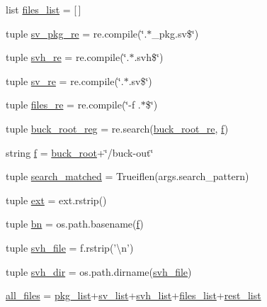\begin{DoxyCompactItemize}
\item 
list \hyperlink{namespacesrc_1_1fb__utils_a09317442a563dfcfc733583405a3b8c9}{files\-\_\-list} = \mbox{[}$\,$\mbox{]}
\item 
tuple \hyperlink{namespacesrc_1_1fb__utils_a266877c1370ada613f730519fd34b9d7}{sv\-\_\-pkg\-\_\-re} = re.\-compile(\char`\"{}.$\ast$\-\_\-pkg.\-sv\$\char`\"{})
\item 
tuple \hyperlink{namespacesrc_1_1fb__utils_a2d3b89c1330a7966a1d3d0a041f20ca1}{svh\-\_\-re} = re.\-compile(\char`\"{}.$\ast$.svh\$\char`\"{})
\item 
tuple \hyperlink{namespacesrc_1_1fb__utils_a6bfea0b85351ac8f7f08a890fddf6fb7}{sv\-\_\-re} = re.\-compile(\char`\"{}.$\ast$.sv\$\char`\"{})
\item 
tuple \hyperlink{namespacesrc_1_1fb__utils_abc8054623770bcd1655722e59ffe067e}{files\-\_\-re} = re.\-compile(\char`\"{}-\/f .$\ast$\$\char`\"{})
\item 
tuple \hyperlink{namespacesrc_1_1fb__utils_a678c407157c5d26ec8e3e6e4b96ba183}{buck\-\_\-root\-\_\-reg} = re.\-search(\hyperlink{namespacesrc_1_1fb__utils_aa9db9d7eca83e9593edbe27a7f90fe32}{buck\-\_\-root\-\_\-re}, \hyperlink{namespacesrc_1_1fb__utils_a43a093e426256f2ab545fa87abf33416}{f})
\item 
string \hyperlink{namespacesrc_1_1fb__utils_a43a093e426256f2ab545fa87abf33416}{f} = \hyperlink{namespacesrc_1_1fb__utils_ada262490c393f4f9b3af89babf6508e2}{buck\-\_\-root}+\char`\"{}/buck-\/out\char`\"{}
\item 
tuple \hyperlink{namespacesrc_1_1fb__utils_aead8496e20f1296a9a85f942af37e40b}{search\-\_\-matched} = Trueiflen(args.\-search\-\_\-pattern)
\item 
tuple \hyperlink{namespacesrc_1_1fb__utils_a95107e9cf9c2d3e1d3f48e33b739553f}{ext} = ext.\-rstrip()
\item 
tuple \hyperlink{namespacesrc_1_1fb__utils_adddc80ad56f52f8f4d9480c01d8eb23f}{bn} = os.\-path.\-basename(\hyperlink{namespacesrc_1_1fb__utils_a43a093e426256f2ab545fa87abf33416}{f})
\item 
tuple \hyperlink{namespacesrc_1_1fb__utils_a9cf6dcc0e62293c0087385b32e64737c}{svh\-\_\-file} = f.\-rstrip('\textbackslash{}n')
\item 
tuple \hyperlink{namespacesrc_1_1fb__utils_a715aba9608eaec84c52cf1ab50a3f061}{svh\-\_\-dir} = os.\-path.\-dirname(\hyperlink{namespacesrc_1_1fb__utils_a9cf6dcc0e62293c0087385b32e64737c}{svh\-\_\-file})
\item 
\hyperlink{namespacesrc_1_1fb__utils_ac4cea1647165c2b200ee1507d4385d9c}{all\-\_\-files} = \hyperlink{namespacesrc_1_1fb__utils_aca9435d4a8098b550d3f06d94fe5d548}{pkg\-\_\-list}+\hyperlink{namespacesrc_1_1fb__utils_ae8e6404645e507153d25d4fc42b3b024}{sv\-\_\-list}+\hyperlink{namespacesrc_1_1fb__utils_af652a83d9c7ea441da07100ce81e0795}{svh\-\_\-list}+\hyperlink{namespacesrc_1_1fb__utils_a09317442a563dfcfc733583405a3b8c9}{files\-\_\-list}+\hyperlink{namespacesrc_1_1fb__utils_a48973a5f6d3b86bb52822b7c85f61444}{rest\-\_\-list}
\end{DoxyCompactItemize}


